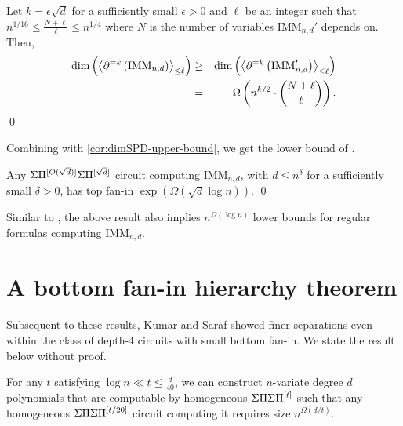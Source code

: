 \begin{theorem}Let $k = \epsilon\sqrt{d}$ for a sufficiently small $\epsilon > 0$ and $\ell$ be an integer such that $n^{1/16} \leq \frac{N + \ell}{\ell} \leq n^{1/4}$ where $N$ is the number of variables $\mathrm{IMM}_{n,d}'$ depends on. 
Then, 
\begin{eqnarray*}
\dim\left(\left\langle\partial^{=k}\left(\mathrm{IMM}_{n,d}\right)\right\rangle_{\leq \ell}\right) &\geq& \dim\left(\left\langle\partial^{=k}\left(\mathrm{IMM}'_{n,d}\right)\right\rangle_{\leq \ell}\right) \\
& =& \Omega\left(n^{k/2} \cdot \binom{N + \ell}{\ell}\right).
\end{eqnarray*}
\qed
\end{theorem}

Combining with \autoref{cor:dimSPD-upper-bound}, we get the lower bound of \cite{FLMS13}. 

\begin{theorem}
Any $\Sigma\Pi^{[O(\sqrt{d})]}\Sigma\Pi^{[\sqrt{d}]}$ circuit computing $\mathrm{IMM}_{n,d}$, with $d \leq n^{\delta}$ for a sufficiently small $\delta > 0$, has top fan-in $\exp(\Omega(\sqrt{d}\log n))$. \qed
\end{theorem}

Similar to \cite{KSS13}, the above result also implies $n^{\Omega(\log n)}$ lower bounds for regular formulas computing $\mathrm{IMM}_{n,d}$. 

\section{A bottom fan-in hierarchy theorem}

Subsequent to these results, Kumar and Saraf \cite{KS14a} showed finer separations even within the class of depth-4 circuits with small bottom fan-in.
We state the result below without proof.

\begin{theorem}[\cite{KS14a}]\label{thm:ks-hierarchy}
For any $t$ satisfying $\log n  \ll  t \leq \frac{d}{40}$, we can construct $n$-variate degree $d$ polynomials that are computable by homogeneous $\Sigma\Pi\Sigma\Pi^{[t]}$ such that any homogeneous $\Sigma\Pi\Sigma\Pi^{[t/20]}$ circuit computing it requires size $n^{\Omega(d/t)}$. 
\end{theorem}



